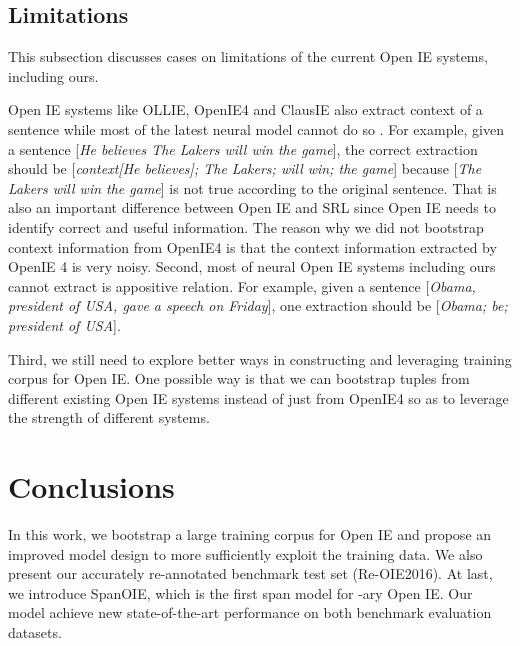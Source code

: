 \documentclass[letterpaper]{article} \usepackage{aaai20}  \usepackage{times}  \usepackage{helvet} \usepackage{courier}  \usepackage[hyphens]{url}  \urlstyle{rm} \def\UrlFont{\rm}  \usepackage{graphicx}  \frenchspacing  \setlength{\pdfpagewidth}{8.5in}  \setlength{\pdfpageheight}{11in}
\begin{document}
\subsection{Limitations}
This subsection discusses cases on limitations of the current Open IE systems, including ours.

Open IE systems like OLLIE, OpenIE4 and ClausIE also extract context of a sentence while most of the latest neural model cannot do so
. For example, given a sentence [\emph{He believes The Lakers will win the game}], the correct extraction should be [\emph{context[He believes]; The Lakers; will win; the game}] because [\emph{The Lakers will win the game}] is not true according to the original sentence. That is also an important difference between Open IE and SRL since Open IE needs to identify correct and useful information. The reason why we did not bootstrap context information from OpenIE4 is that the context information extracted by OpenIE 4 is very noisy. Second, most of neural Open IE systems including ours cannot extract is appositive relation. For example, given a sentence [\emph{Obama, president of USA, gave a speech on Friday}], one extraction should be [\emph{Obama; be; president of USA}].

Third, we still need to explore better ways in constructing and leveraging training corpus for Open IE. One possible way is that we can bootstrap tuples from different existing Open IE systems instead of just from OpenIE4 so as to leverage the strength of different systems.

\section{Conclusions}
In this work, we bootstrap a large training corpus for Open IE and propose an improved model design to more sufficiently exploit the training data. We also present our accurately re-annotated benchmark test set (Re-OIE2016). At last, we introduce SpanOIE, which is the first span model for -ary Open IE. Our model achieve new state-of-the-art performance on both benchmark evaluation datasets.



\end{document}
